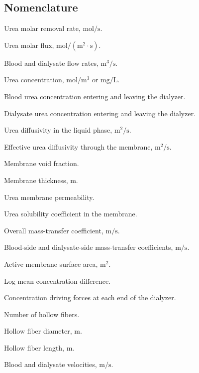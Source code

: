 \subsection{Nomenclature}

\vspace{-0.3cm}
\begin{description}
    \setlength\itemsep{-0.15cm}
    \setlength\parskip{0pt}
    \setlength\parsep{0pt}

    \item[\(\dot{n}_A\)] Urea molar removal rate, \(\mathrm{mol/s}\).
    \item[\(J_A\)] Urea molar flux, \(\mathrm{mol/(m^2 \cdot s)}\).
    \item[\(Q_b, Q_d\)] Blood and dialysate flow rates, \(\mathrm{m^3/s}\).
    \item[\(C_A\)] Urea concentration, \(\mathrm{mol/m^3}\) or \(\mathrm{mg/L}\).
    \item[\(C_{b,i}, C_{b,o}\)] Blood urea concentration entering and leaving the dialyzer.
    \item[\(C_{d,i}, C_{d,o}\)] Dialysate urea concentration entering and leaving the dialyzer.

    \item[\(D_{AB}\)] Urea diffusivity in the liquid phase, \(\mathrm{m^2/s}\).
    \item[\(D_{\text{eff}}\)] Effective urea diffusivity through the membrane, \(\mathrm{m^2/s}\).
    \item[\(\varepsilon\)] Membrane void fraction.
    \item[\(\delta_m\)] Membrane thickness, \(\mathrm{m}\).
    \item[\(P_A\)] Urea membrane permeability.
    \item[\(S_A\)] Urea solubility coefficient in the membrane.

    \item[\(K_o\)] Overall mass-transfer coefficient, \(\mathrm{m/s}\).
    \item[\(k_b, k_d\)] Blood-side and dialysate-side mass-transfer coefficients, \(\mathrm{m/s}\).
    \item[\(A_m\)] Active membrane surface area, \(\mathrm{m^2}\).
    \item[\(\Delta C_{\text{lm}}\)] Log-mean concentration difference.
    \item[\(\Delta C_1, \Delta C_2\)] Concentration driving forces at each end of the dialyzer.

    \item[\(N_f\)] Number of hollow fibers.
    \item[\(d_f\)] Hollow fiber diameter, \(\mathrm{m}\).
    \item[\(L\)] Hollow fiber length, \(\mathrm{m}\).
    \item[\(u_b, u_d\)] Blood and dialysate velocities, \(\mathrm{m/s}\).


\end{description}
